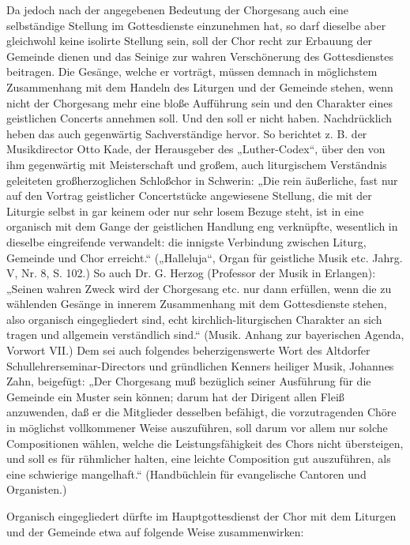 Da jedoch nach der angegebenen Bedeutung der Chorgesang auch eine selbständige Stellung im Gottesdienste einzunehmen hat, so darf dieselbe aber gleichwohl keine isolirte Stellung sein, soll der Chor recht zur Erbauung der Gemeinde dienen und das Seinige zur wahren Verschönerung des Gottesdienstes beitragen. Die Gesänge, welche er vorträgt, müssen demnach in möglichstem Zusammenhang mit dem Handeln des Liturgen und der Gemeinde stehen, wenn nicht der Chorgesang mehr eine bloße Aufführung sein und den Charakter eines geistlichen Concerts annehmen soll. Und den soll er nicht haben. Nachdrücklich heben das auch gegenwärtig Sachverständige hervor. So berichtet z. B. der Musikdirector Otto Kade, der Herausgeber des „Luther-Codex“, über den von ihm gegenwärtig mit Meisterschaft und großem, auch liturgischem Verständnis geleiteten großherzoglichen Schloßchor in Schwerin: „Die rein äußerliche, fast nur auf den Vortrag geistlicher Concertstücke angewiesene Stellung, die mit der Liturgie selbst in gar keinem oder nur sehr losem Bezuge steht, ist in eine organisch mit dem Gange der geistlichen Handlung eng verknüpfte, wesentlich in dieselbe eingreifende verwandelt: die innigste Verbindung zwischen Liturg, Gemeinde und Chor erreicht.“ („Halleluja“, Organ für geistliche Musik etc. Jahrg. V, Nr. 8, S. 102.) So auch Dr. G. Herzog (Professor der Musik in Erlangen): „Seinen wahren Zweck wird der Chorgesang etc. nur dann erfüllen, wenn die zu wählenden Gesänge in innerem Zusammenhang mit dem Gottesdienste stehen, also organisch eingegliedert sind, echt kirchlich-liturgischen Charakter an sich tragen und allgemein verständlich sind.“ (Musik. Anhang zur bayerischen Agenda, Vorwort VII.) Dem sei auch folgendes beherzigenswerte Wort des Altdorfer Schullehrerseminar-Directors und gründlichen Kenners heiliger Musik, Johannes Zahn, beigefügt: „Der Chorgesang muß bezüglich seiner Ausführung für die Gemeinde ein Muster sein können; darum hat der Dirigent allen Fleiß anzuwenden, daß er die Mitglieder desselben befähigt, die vorzutragenden Chöre in möglichst vollkommener Weise auszuführen, soll darum vor allem nur solche Compositionen wählen, welche die Leistungsfähigkeit des Chors nicht übersteigen, und soll es für
rühmlicher halten, eine leichte Composition gut auszuführen, als eine schwierige mangelhaft.“ (Handbüchlein für evangelische Cantoren und Organisten.)

Organisch eingegliedert dürfte im Hauptgottesdienst der Chor mit dem Liturgen und der Gemeinde etwa auf folgende Weise zusammenwirken:

